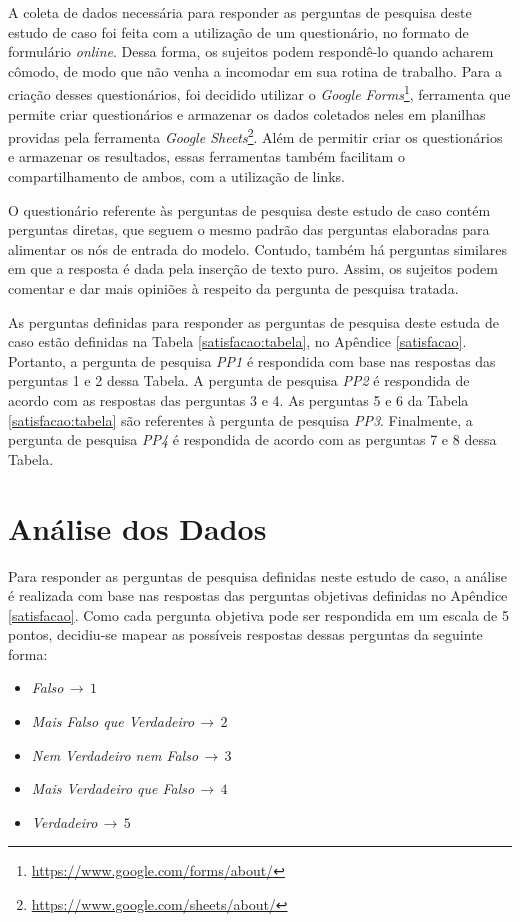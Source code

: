 A coleta de dados necessária para responder as perguntas de pesquisa deste estudo de caso foi feita com a utilização de um questionário, no formato de formulário \textit{online}. Dessa forma, os sujeitos podem respondê-lo quando acharem cômodo, de modo que não venha a incomodar em sua rotina de trabalho. Para a criação desses questionários, foi decidido utilizar o \textit{Google Forms}\footnote{\url{https://www.google.com/forms/about/}}, ferramenta que permite criar questionários e armazenar os dados coletados neles em planilhas providas pela ferramenta \textit{Google Sheets}\footnote{\url{https://www.google.com/sheets/about/}}. Além de permitir criar os questionários e armazenar os resultados, essas ferramentas também facilitam o compartilhamento de ambos, com a utilização de links.

O questionário referente às perguntas de pesquisa deste estudo de caso contém perguntas diretas, que seguem o mesmo padrão das perguntas elaboradas para alimentar os nós de entrada do modelo. Contudo, também há perguntas similares em que a resposta é dada pela inserção de texto puro. Assim, os sujeitos podem comentar e dar mais opiniões à respeito da pergunta de pesquisa tratada.

As perguntas definidas para responder as perguntas de pesquisa deste estuda de caso estão definidas na Tabela \ref{satisfacao:tabela}, no Apêndice \ref{satisfacao}. Portanto, a pergunta de pesquisa \textit{PP1} é respondida com base nas respostas das perguntas 1 e 2 dessa Tabela. A pergunta de pesquisa \textit{PP2} é respondida de acordo com as respostas das perguntas 3 e 4. As perguntas 5 e 6 da Tabela \ref{satisfacao:tabela} são referentes à pergunta de pesquisa \textit{PP3}. Finalmente, a pergunta de pesquisa \textit{PP4} é respondida de acordo com as perguntas 7 e 8 dessa Tabela.

\section{Análise dos Dados}
\label{estudodecaso:analise}

Para responder as perguntas de pesquisa definidas neste estudo de caso, a análise é realizada com base nas respostas das perguntas objetivas definidas no Apêndice \ref{satisfacao}. Como cada pergunta objetiva pode ser respondida em um escala de 5 pontos, decidiu-se mapear as possíveis respostas dessas perguntas da seguinte forma:

\begin{itemize}
  \item \textit{Falso}$\,\to\,1$
  \item \textit{Mais Falso que Verdadeiro}$\,\to\,2$
  \item \textit{Nem Verdadeiro nem Falso}$\,\to\,3$
  \item \textit{Mais Verdadeiro que Falso}$\,\to\,4$
  \item \textit{Verdadeiro}$\,\to\,5$
\end{itemize}

